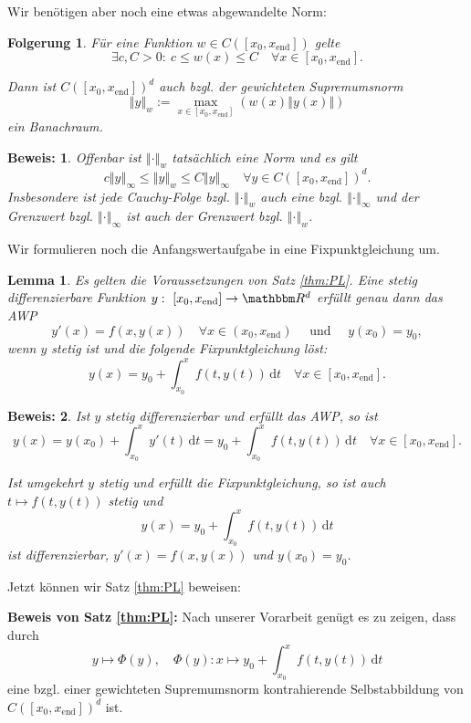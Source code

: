 \documentclass[12pt,a4paper]{book}
\theoremstyle{break}
\newtheorem{korollar}[theorem]{Folgerung}
\newtheorem{lemma}[theorem]{Lemma}
\theoremstyle{nonumberplain}
\newtheorem{beweis}{Beweis:}
\newcommand{\R}{\mathbbm R}
\newcommand{\norm}[1]{\left\Vert#1\right\Vert}		%
\newcommand{\1}{\mathbbm{1}} 			      	%
\newcommand{\dx}[1][x]{\ensuremath{\, \mathrm{d} #1}} 	%
\begin{document}
Wir benötigen aber noch eine etwas abgewandelte Norm:
\begin{korollar}\label{kor:gewSupNorm}
Für eine Funktion $w\in C([x_0,x_\mathrm{end}])$ gelte
\[
\exists c,C>0:\ c\leq w(x)\leq C \quad \forall x\in [x_0,x_\mathrm{end}].
\]

Dann ist $C([x_0,x_\mathrm{end}])^d$ auch bzgl. der 
\emph{gewichteten Supremumsnorm} 
\[
\norm{y}_w:= \max_{x\in [x_0,x_\mathrm{end}]} \left( w(x) \norm{y(x)}\right)
\]
ein Banachraum.
\end{korollar}
\begin{beweis}
Offenbar ist $\norm{\cdot}_w$ tatsächlich eine Norm und es gilt 
\[
c\norm{y}_\infty \leq \norm{y}_w\leq C\norm{y}_\infty \quad \forall y\in C([x_0,x_\mathrm{end}])^d.
\]
Insbesondere ist jede Cauchy-Folge bzgl. $\norm{\cdot}_w$ auch eine bzgl. $\norm{\cdot}_\infty$ und
der Grenzwert bzgl. $\norm{\cdot}_\infty$ ist auch der Grenzwert bzgl. $\norm{\cdot}_w$.
\end{beweis}

Wir formulieren noch die Anfangswertaufgabe in eine Fixpunktgleichung um.
\begin{lemma}\label{lemma:PL_hilf}
Es gelten die Voraussetzungen von  Satz \ref{thm:PL}. Eine 
stetig differenzierbare Funktion $y:\ [x_0,x_\mathrm{end}]\to \R^d$ erfüllt genau dann das AWP
\[
y'(x)=f(x,y(x)) \quad \forall x\in (x_0,x_\mathrm{end}) \quad \mbox{ und } \quad y(x_0)=y_0,
\]
wenn $y$ stetig ist und die folgende Fixpunktgleichung löst:
\[
y(x)=y_0+ \int_{x_0}^x f(t,y(t))\dx[t] \quad \forall x\in  [x_0,x_\mathrm{end}].
\]
\end{lemma}
\begin{beweis}
Ist $y$ stetig differenzierbar und erfüllt das AWP, so ist 
\[
y(x)=y(x_0)+\int_{x_0}^x y'(t) \dx[t]=y_0+ \int_{x_0}^x f(t,y(t))\dx[t] \quad \forall x\in  [x_0,x_\mathrm{end}].
\]

Ist umgekehrt $y$ stetig und erfüllt die Fixpunktgleichung,
so ist auch $t\mapsto f(t,y(t))$ stetig und
\[
y(x)=y_0+ \int_{x_0}^x f(t,y(t))\dx[t]
\]
ist differenzierbar, $y'(x)=f(x,y(x))$ und $y(x_0)=y_0$.
\end{beweis}

Jetzt können wir Satz \ref{thm:PL} beweisen:

\textbf{Beweis von Satz \ref{thm:PL}:} Nach unserer Vorarbeit genügt es zu zeigen, 
dass durch
\[
y \mapsto \Phi(y), \quad \Phi(y): x\mapsto y_0+ \int_{x_0}^x f(t,y(t))\dx[t]
\]
eine bzgl. einer gewichteten Supremumsnorm kontrahierende Selbstabbildung von 
$C([x_0,x_\mathrm{end}])^d$ ist.
\end{document}
